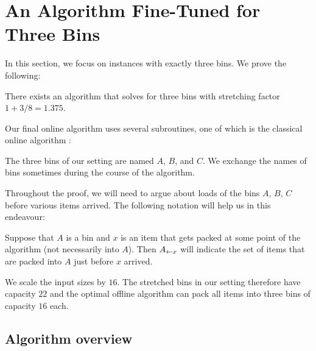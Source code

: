 \openright\chapter{An Algorithm Fine-Tuned for Three Bins}
\label{chap:threebins}

In this section, we focus on instances with exactly three bins. 
We prove the following:

\begin{thm}\label{thm:3binsalgo}
There exists an algorithm that solves
\binstretch for three bins with stretching factor $1+3/8=1.375$.
\end{thm}

Our final online algorithm uses several subroutines, one of which is
the classical online algorithm \FF:

\smallskip
{}
\smallskip

The three bins of our setting are named $A$, $B$, and $C$.  We
exchange the names of bins sometimes during the course of the
algorithm.

Throughout the proof, we will need to argue about loads of the bins
$A$, $B$, $C$ before various items arrived. The following notation
will help us in this endeavour:

Suppose that $A$ is a bin and $x$ is an item that gets packed at some
point of the algorithm (not necessarily into $A$).  Then $A_{\leftarrow
x}$ will indicate the set of items that are packed into $A$ just
before $x$ arrived.

We scale the input sizes by $16$. The stretched bins in our setting
therefore have capacity $22$ and the optimal offline algorithm can
pack all items into three bins of capacity $16$ each.

\section{Algorithm overview}\label{sec:3:algoverview}

